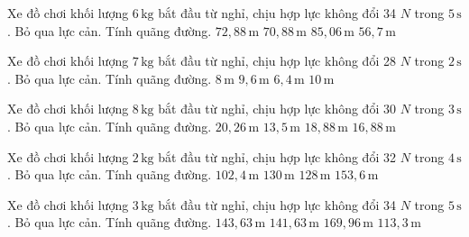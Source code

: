 \begin{ex}
Xe đồ chơi khối lượng $6\,\text{kg}$ bắt đầu từ nghỉ, chịu hợp lực không đổi 34 $N$ trong $5\,\text{s}$. Bỏ qua lực cản. Tính quãng đường.
\choice
{$72,88\,\text{m}$}
{\True $70,88\,\text{m}$}
{$85,06\,\text{m}$}
{$56,7\,\text{m}$}
\end{ex}

\begin{ex}
Xe đồ chơi khối lượng $7\,\text{kg}$ bắt đầu từ nghỉ, chịu hợp lực không đổi 28 $N$ trong $2\,\text{s}$. Bỏ qua lực cản. Tính quãng đường.
\choice
{\True $8\,\text{m}$}
{$9,6\,\text{m}$}
{$6,4\,\text{m}$}
{$10\,\text{m}$}
\end{ex}

\begin{ex}
Xe đồ chơi khối lượng $8\,\text{kg}$ bắt đầu từ nghỉ, chịu hợp lực không đổi 30 $N$ trong $3\,\text{s}$. Bỏ qua lực cản. Tính quãng đường.
\choice
{$20,26\,\text{m}$}
{$13,5\,\text{m}$}
{$18,88\,\text{m}$}
{\True $16,88\,\text{m}$}
\end{ex}

\begin{ex}
Xe đồ chơi khối lượng $2\,\text{kg}$ bắt đầu từ nghỉ, chịu hợp lực không đổi 32 $N$ trong $4\,\text{s}$. Bỏ qua lực cản. Tính quãng đường.
\choice
{$102,4\,\text{m}$}
{$130\,\text{m}$}
{\True $128\,\text{m}$}
{$153,6\,\text{m}$}
\end{ex}

\begin{ex}
Xe đồ chơi khối lượng $3\,\text{kg}$ bắt đầu từ nghỉ, chịu hợp lực không đổi 34 $N$ trong $5\,\text{s}$. Bỏ qua lực cản. Tính quãng đường.
\choice
{$143,63\,\text{m}$}
{\True $141,63\,\text{m}$}
{$169,96\,\text{m}$}
{$113,3\,\text{m}$}
\end{ex}

